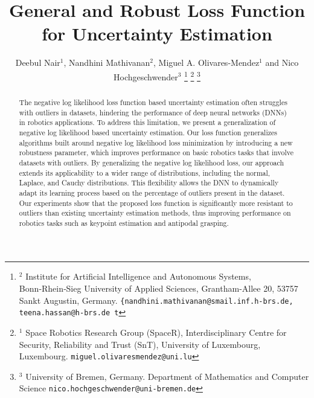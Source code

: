\documentclass[letterpaper, 10 pt, conference]{ieeeconf}  %
\title{\LARGE \bf
General and Robust Loss Function for Uncertainty Estimation}
\author{Deebul Nair$^{1}$, Nandhini Mathivanan$^{2}$, Miguel A. Olivares-Mendez$^{1}$ and Nico Hochgeschwender$^{3}$   %
\thanks{$^{2}$ Institute for Artificial Intelligence and Autonomous Systems, Bonn‑Rhein‑Sieg University of Applied Sciences, Grantham-Allee 20, 53757 Sankt Augustin, Germany.
        {\tt\small \{nandhini.mathivanan@smail.inf.h-brs.de, teena.hassan@h-brs.de t}}%
\thanks{$^{1}$ Space Robotics Research Group (SpaceR), Interdisciplinary Centre for Security, Reliability and Trust (SnT), University of Luxembourg, Luxembourg. {\tt\small miguel.olivaresmendez@uni.lu}}
\thanks{$^{3}$ University of Bremen, Germany. Department of Mathematics and Computer Science {\tt\small nico.hochgeschwender@uni-bremen.de}}%
}
\begin{document}
\maketitle
\thispagestyle{empty}
\pagestyle{empty}


\begin{abstract}


The negative log likelihood loss function based uncertainty estimation often struggles with outliers in datasets, hindering the performance of deep neural networks (DNNs) in robotics applications. 
To address this limitation, we present a generalization of negative log likelihood based uncertainty estimation.
Our loss function generalizes algorithms built around negative log likelihood loss minimization by introducing a new robustness parameter, which improves performance on basic robotics tasks that involve datasets with outliers.
By generalizing the negative log likelihood loss, our approach extends its applicability to a wider range of distributions, including the normal, Laplace, and Cauchy distributions. This flexibility allows the DNN to dynamically adapt its learning process based on the percentage of outliers present in the dataset.
Our experiments show that the proposed loss function is significantly more resistant to outliers than existing uncertainty estimation methods, thus improving performance on robotics tasks such as keypoint estimation and antipodal grasping.
\end{abstract}


\end{document}
